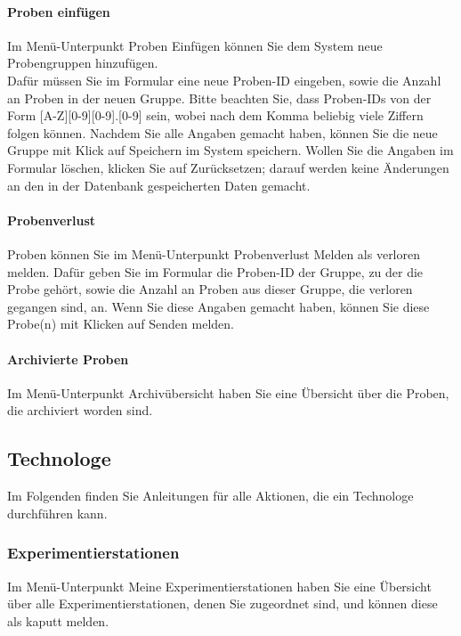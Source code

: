 \documentclass[enabledeprecatedfontcommands,fontsize=12pt,paper=a4,twoside]{scrartcl}
\begin{document}
\paragraph{Proben einfügen}
Im Menü-Unterpunkt Proben Einfügen können Sie dem System neue Probengruppen hinzufügen. \\

Dafür müssen Sie im Formular eine neue Proben-ID eingeben, sowie die Anzahl an Proben in der neuen Gruppe. Bitte beachten Sie, dass Proben-IDs von der Form [A-Z][0-9][0-9].[0-9] sein, wobei nach dem Komma beliebig viele Ziffern folgen können. Nachdem Sie alle Angaben gemacht haben, können Sie die neue Gruppe mit Klick auf Speichern im System speichern. Wollen Sie die Angaben im Formular löschen, klicken Sie auf Zurücksetzen; darauf werden keine Änderungen an den in der Datenbank gespeicherten Daten gemacht. \\
\paragraph{Probenverlust}
Proben können Sie im Menü-Unterpunkt Probenverlust Melden als verloren melden. Dafür geben Sie im Formular die Proben-ID der Gruppe, zu der die Probe gehört, sowie die Anzahl an Proben aus dieser Gruppe, die verloren gegangen sind, an. Wenn Sie diese Angaben gemacht haben, können Sie diese Probe(n) mit Klicken auf Senden melden. \\

\paragraph{Archivierte Proben}
Im Menü-Unterpunkt Archivübersicht haben Sie eine Übersicht über die Proben, die archiviert worden sind. \\

\subsection{Technologe}

Im Folgenden finden Sie Anleitungen für alle Aktionen, die ein Technologe durchführen kann. \\

\subsubsection{Experimentierstationen}
Im Menü-Unterpunkt Meine Experimentierstationen haben Sie eine Übersicht über alle Experimentierstationen, denen Sie zugeordnet sind, und können diese als kaputt melden. \\
\end{document}
